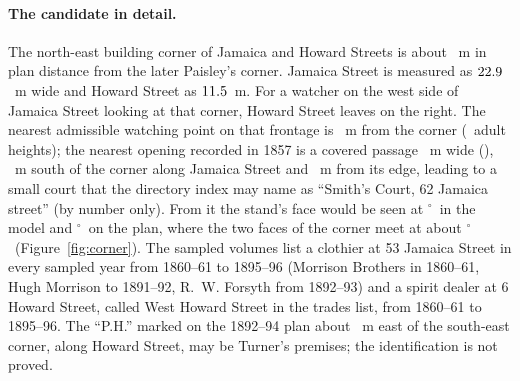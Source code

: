 \documentclass[10pt,a4paper]{article}
\newcommand{\degree}{$^\circ$}
\begin{document}
\begin{table}[htbp]\centering\scriptsize
\caption{Every orientation that passes the geometric relations with or without the handedness convention, ordered by the distance $D$ from the corner to its nearest admissible watching point on the facing frontage. ``Hand.'': passes with the handedness convention. ``1857'': nearest admissible opening recorded on the 1857 plan. Then the 1877--78 directory evidence \citep{pod}. Bold: clothier fronting X and licensed premises both attested. $\dagger$: Y or X is a lane; excluded from the principal census, kept in the first coding. ``On X: no'': the clothier's only address is on Y. ``Partial'': a positional or trade near-match; ``unknown'': the premises could not be tied to the corner, or the OCR was silent. Rows other than Jamaica $\times$ Howard NE and Jamaica $\times$ Argyle SW (Argyle / Jamaica) were read in the OCR only. Generated from the data by the companion code.}\label{tab:corners}

\end{table}

\paragraph{The candidate in detail.} The north-east building corner of Jamaica and Howard Streets is about \DPaisleyA~m in plan distance from the later Paisley's corner. Jamaica Street is measured as $22.9$~m wide and Howard Street as $11.5$~m. For a watcher on the west side of Jamaica Street looking at that corner, Howard Street leaves on the right. The nearest admissible watching point on that frontage is \DnearJH~m from the corner (\DnearJHH\ adult heights); the nearest opening recorded in 1857 is a covered passage \SfourWidth~m wide (\SfourOpen), \Sfourd~m south of the corner along Jamaica Street and \SfourD~m from its edge, leading to a small court that the directory index may name as ``Smith's Court, 62 Jamaica street'' (by number only). From it the stand's face would be seen at \SfourAngle\degree\ in the model and \SfourAnglePlan\degree\ on the plan, where the two faces of the corner meet at about \CornerAngleJH\degree\ (Figure~\ref{fig:corner}). The sampled volumes list a clothier at 53 Jamaica Street in every sampled year from 1860--61 to 1895--96 (Morrison Brothers in 1860--61, Hugh Morrison to 1891--92, R.~W. Forsyth from 1892--93) and a spirit dealer at 6 Howard Street, called West Howard Street in the trades list, from 1860--61 to 1895--96. The ``P.H.'' marked on the 1892--94 plan about \DPHSE~m east of the south-east corner, along Howard Street, may be Turner's premises; the identification is not proved.
\end{document}
